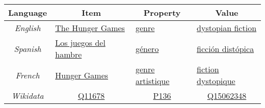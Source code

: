 \documentclass{standalone}
\begin{document}
\begin{tabular}{|c|l|l|l|}
    \hline
    \rowcolor[HTML]{EFEFEF}
    \textbf{Language} & \multicolumn{1}{c|}{\cellcolor[HTML]{EFEFEF}\textbf{Item}}                              & \multicolumn{1}{c|}{\cellcolor[HTML]{EFEFEF}\textbf{Property}}                            & \multicolumn{1}{c|}{\cellcolor[HTML]{EFEFEF}\textbf{Value}}                             \\ \hline
    \textit{English}  & \multicolumn{1}{l|}{\href{https://www.wikidata.org/wiki/Q11678}{The Hunger Games}}      & \multicolumn{1}{l|}{\href{https://www.wikidata.org/wiki/Property:P136}{genre}}            & \multicolumn{1}{l|}{\href{https://www.wikidata.org/wiki/Q15062348}{dystopian fiction}}  \\ \hline
    \textit{Spanish}  & \multicolumn{1}{l|}{\href{https://www.wikidata.org/wiki/Q11678}{Los juegos del hambre}} & \multicolumn{1}{l|}{\href{https://www.wikidata.org/wiki/Property:P136}{género}}           & \multicolumn{1}{l|}{\href{https://www.wikidata.org/wiki/Q15062348}{ficción distópica}}  \\ \hline
    \textit{French}   & \multicolumn{1}{l|}{ \href{https://www.wikidata.org/wiki/Q11678}{Hunger Games}}         & \multicolumn{1}{l|}{\href{https://www.wikidata.org/wiki/Property:P136}{genre artistique}} & \multicolumn{1}{l|}{\href{https://www.wikidata.org/wiki/Q15062348}{fiction dystopique}} \\ \hline
    \textit{Wikidata} & \multicolumn{1}{c|}{\href{https://www.wikidata.org/wiki/Q11678}{Q11678}}                & \multicolumn{1}{c|}{\href{https://www.wikidata.org/wiki/Property:P136}{P136}}             & \multicolumn{1}{c|}{\href{https://www.wikidata.org/wiki/Q15062348}{Q15062348}}          \\ \cline{2-4}
\end{tabular}
\end{document}
